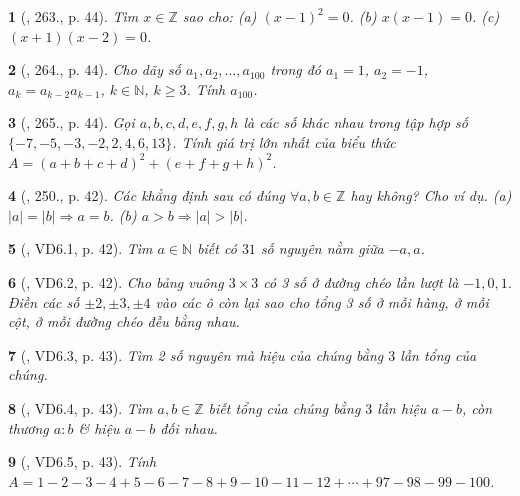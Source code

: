 \documentclass{article}
\newtheorem{baitoan}{}
\begin{document}
\begin{baitoan}[\cite{Binh_Toan_6_tap_1}, 263., p. 44]
	Tìm $x\in\mathbb{Z}$ sao cho: (a) $(x - 1)^2 = 0$. (b) $x(x - 1) = 0$. (c) $(x + 1)(x - 2) = 0$.
\end{baitoan}

\begin{baitoan}[\cite{Binh_Toan_6_tap_1}, 264., p. 44]
	Cho dãy số $a_1,a_2,\ldots,a_{100}$ trong đó $a_1 = 1$, $a_2 = -1$, $a_k = a_{k-2}a_{k-1}$, $k\in\mathbb{N}$, $k\ge 3$. Tính $a_{100}$.
\end{baitoan}

\begin{baitoan}[\cite{Binh_Toan_6_tap_1}, 265., p. 44]
	Gọi $a,b,c,d,e,f,g,h$ là các số khác nhau trong tập hợp số $\{-7,-5,-3,-2,2,4,6,13\}$. Tính giá trị lớn nhất của biểu thức $A = (a + b + c + d)^2 + (e + f + g + h)^2$.
\end{baitoan}

\begin{baitoan}[\cite{Binh_Toan_6_tap_1}, 250., p. 42]
	Các khẳng định sau có đúng $\forall a,b\in\mathbb{Z}$ hay không? Cho ví dụ. (a) $|a| = |b|\Rightarrow a = b$. (b) $a > b\Rightarrow|a| > |b|$.	
\end{baitoan}

\begin{baitoan}[\cite{TLCT_THCS_Toan_6_so_hoc}, VD6.1, p. 42]
	Tìm $a\in\mathbb{N}$ biết có $31$ số nguyên nằm giữa $-a,a$.
\end{baitoan}

\begin{baitoan}[\cite{TLCT_THCS_Toan_6_so_hoc}, VD6.2, p. 42]
	Cho bảng vuông $3\times3$ có 3 số ở đường chéo lần lượt là $-1,0,1$. Điền các số $\pm2,\pm3,\pm4$ vào các ô còn lại sao cho tổng 3 số ở mỗi hàng, ở mỗi cột, ở mỗi đường chéo đều bằng nhau.
\end{baitoan}

\begin{baitoan}[\cite{TLCT_THCS_Toan_6_so_hoc}, VD6.3, p. 43]
	Tìm 2 số nguyên mà hiệu của chúng bằng $3$ lần tổng của chúng.
\end{baitoan}

\begin{baitoan}[\cite{TLCT_THCS_Toan_6_so_hoc}, VD6.4, p. 43]
	Tìm $a,b\in\mathbb{Z}$ biết tổng của chúng bằng $3$ lần hiệu $a - b$, còn thương $a:b$ \& hiệu $a - b$ đối nhau.
\end{baitoan}

\begin{baitoan}[\cite{TLCT_THCS_Toan_6_so_hoc}, VD6.5, p. 43]
	Tính $A = 1 - 2 - 3 - 4 + 5 - 6 - 7 - 8 + 9 - 10 - 11 - 12 + \cdots + 97 - 98 - 99 - 100$.
\end{baitoan}
\end{document}
